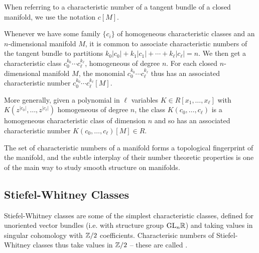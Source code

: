 \begin{convention*}
	When referring to a characteristic number of a tangent bundle of a closed manifold, we use the notation $c[M]$.
\end{convention*}

\begin{remark}\label{rmk:characteristic-number-monomial-polynomial}
	Whenever we have some family $\{c_i\}$ of homogeneous characteristic classes and an $n$-dimensional manifold $M$, it is common to associate characteristic numbers of the tangent bundle to partitions $k_0|c_0|+k_1|c_1|+\cdots+k_\ell|c_\ell| = n$. We then get a characteristic class $c_0^{k_0}\cdots c_\ell^{k_\ell}$, homogeneous of degree $n$. For each closed $n$-dimensional manifold $M$, the monomial $c_0^{k_0}\cdots c_\ell^{k_\ell}$ thus has an associated characteristic number $c_0^{k_0}\cdots c_\ell^{k_\ell}[M]$.

	More generally, given a polynomial in $\ell$ variables $K\in R[x_1,\ldots, x_\ell]$ with $K(z^{|c_0|}, \ldots, z^{|c_\ell|})$ homogeneous of degree $n$, the class $K(c_0,\ldots, c_\ell)$ is a homogeneous characteristic class of dimension $n$ and so has an associated characteristic number $K(c_0, \ldots, c_\ell)[M] \in R$.
\end{remark}

The set of characteristic numbers of a manifold forms a topological fingerprint of the manifold, and the subtle interplay of their number theoretic properties is one of the main way to study smooth structure on manifolds.

\subsection{Stiefel-Whitney Classes}

Stiefel-Whitney classes are some of the simplest characteristic classes, defined for unoriented vector bundles (i.e. with structure group $\mathrm{GL}_n\mathbb{R}$) and taking values in singular cohomology with $\mathbb{Z}/2$ coefficients. Characterisic numbers of Stiefel-Whitney classes thus take values in $\mathbb{Z}/2$ -- these are called .

